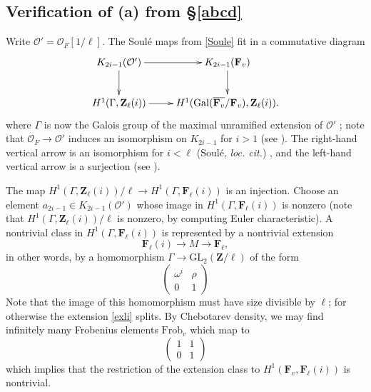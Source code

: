 \documentclass[10pt]{amsart}
\newcommand{\Z}{\mathbf{Z}}
\newcommand{\GL}{\mathrm{GL}}
\theoremstyle{remark}
\begin{document}
   \subsection{Verification of (a) from \S \ref{abcd}} \label{sec:Chebo}
Write $\mathcal{O}' = \mathcal{O}_F[1/\ell]$. 
The  Soul{\'e} maps from \eqref{Soule}  fit in a commutative diagram 
 \begin{equation}
 \xymatrix{
 K_{2i-1}(\mathcal{O}')  \ar[r] \ar[d] & K_{2i-1}(\mathbf{F}_v) \ar[d] \\
 H^1(\Gamma, \Z_{\ell}(i)) \ar[r] & H^1(\mathrm{Gal}(\overline{\mathbf{F}_v}/\mathbf{F}_v), \Z_{\ell}(i))  .
 }
\end{equation}
where $\Gamma$ is  now the Galois group of  the maximal unramified extension  of $\mathcal{O}'$ ; note that  
 $\mathcal{O}_F \rightarrow \mathcal{O}'$ induces an isomorphism on $K_{2i-1}$ for $i > 1$ (see \cite[Theorem 4.6]{Weibel}). 
The right-hand vertical arrow is an isomorphism for $i <\ell$ (Soul{\'e}, {\em loc. cit.}) , and   the left-hand vertical arrow is a surjection (see \cite{Kahn}).
 
 
The map $H^1(\Gamma, \Z_{\ell}(i))/\ell \rightarrow H^1(\Gamma, \mathbf{F}_{\ell}(i))$ 
is an injection.  Choose an element $a_{2i-1} \in K_{2i-1}(\mathcal{O}')$ whose image in $ H^1(\Gamma, \mathbf{F}_{\ell}(i))$
is nonzero (note that $H^1(\Gamma, \mathbf{Z}_{\ell}(i))/\ell$ is nonzero, by computing Euler characteristic). 
A nontrivial class in $H^1(\Gamma, \mathbf{F}_{\ell}(i))$ is represented by a nontrivial extension 
\begin{equation} \label{exli} \mathbf{F}_{\ell}(i) \rightarrow M \rightarrow \mathbf{F}_{\ell},\end{equation} in other words, by a homomorphism
$\Gamma \rightarrow \GL_2(\Z/\ell)$ of the form 
 $$ \left( \begin{array}{cc} \omega^i & \rho \\ 0 & 1 \end{array}\right) $$ 
 Note that the image of this homomorphism must have size divisible by $\ell$; 
for otherwise the extension \eqref{exli} splits. By Chebotarev density, we may find infinitely many Frobenius elements $\mathrm{Frob}_v$ which map
 to 
  $$ \left( \begin{array}{cc} 1 & 1 \\ 0 & 1 \end{array}\right) $$ 
 which  implies that the restriction of the extension class to $H^1(\mathbf{F}_v, \mathbf{F}_{\ell}(i))$ is nontrivial.
 
\end{document}
